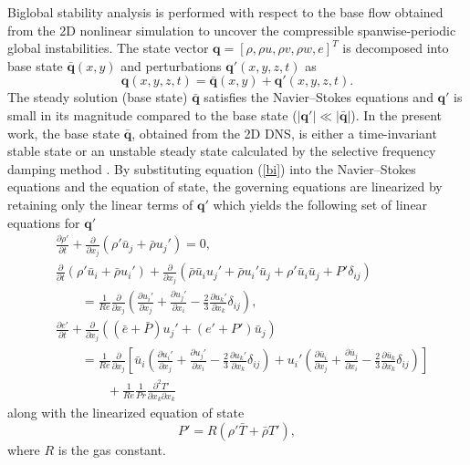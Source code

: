 \documentclass{jfm}
\begin{document}
Biglobal stability analysis is performed with respect to the base flow obtained from the 2D nonlinear simulation to uncover the compressible spanwise-periodic global instabilities. The state vector $\boldsymbol q = [\rho,  \rho u, \rho v, \rho w, e]^T$ is decomposed into base state $\boldsymbol {\bar q}(x,y)$ and perturbations $\boldsymbol {q}'(x,y,z,t)$ as
\begin{equation}
\label{bi}
\boldsymbol q(x,y,z,t) = \boldsymbol {\bar q}(x,y) + \boldsymbol {q}'(x,y,z,t).
\end{equation}
The steady solution (base state) $\boldsymbol {\bar q}$ satisfies the Navier--Stokes equations and $\boldsymbol q'$ is small in its magnitude compared to the base state ($|\boldsymbol q'| \ll |\boldsymbol {\bar q}|$). In the present work, the base state $\boldsymbol {\bar q}$, obtained from the 2D DNS, is either a time-invariant stable state or an unstable steady state calculated by the selective frequency damping method \citep{Akervik:PF06}. By substituting equation (\ref{bi}) into the Navier--Stokes equations and the equation of state, the governing equations are linearized by retaining only the linear terms of $\boldsymbol q'$ which yields the following set of linear equations for $\boldsymbol {q}'$
\begin{equation}
\label{lin}
\begin{split}
& \frac{\partial \rho '}{\partial t} +\frac{\partial }{\partial x_j} (\rho'\bar u_j + \bar \rho u_j' ) = 0, \\
& \frac{\partial }{\partial t} (\rho'\bar u_i + \bar \rho u_i' )+\frac{\partial}{\partial x_j} (\bar{\rho}\bar u_i  u_j' +\bar{\rho} u_i'     \bar u_j + \rho' \bar u_i \bar u_j + P'\delta_{ij}) \\
& \qquad = \frac{1}{Re}\frac{\partial}{\partial x_j}\left(\frac{\partial u_i'}{\partial x_j}+ \frac{\partial u_j'}{\partial x_i}- \frac{2}{3}\frac{\partial u_k'}{\partial x_k}\delta_{ij}\right),\\
& \frac{\partial e'}{\partial t}+ \frac{\partial}{\partial x_j}((\bar e + \bar P) u_j' + (e' + P')\bar u_j) \\
& \qquad =\frac{1}{Re}\frac{\partial}{\partial x_j}\left[\bar u_i \left(\frac{\partial u_i'}{\partial x_j}+\frac{\partial u_j'}{\partial x_i}-\frac{2}{3}\frac{\partial u_k'}{\partial x_k}\delta_{ij}\right)  +u_i'\left(\frac{\partial \bar u_i}{\partial x_j}+ \frac{\partial \bar u_j}{\partial x_i}-\frac{2}{3}\frac{\partial \bar u_k }{\partial x_k}\delta_{ij}\right)\right]\\
& \qquad \qquad +\frac{1}{Re}\frac{1}{Pr}\frac{\partial ^2 T'}{\partial x_k\partial x_k}
\end{split}
\end{equation}
along with the linearized equation of state 
\begin{equation}
P'=R(\rho' \bar T+\bar \rho T'),
\end{equation}
where $R$ is the gas constant.
\end{document}
